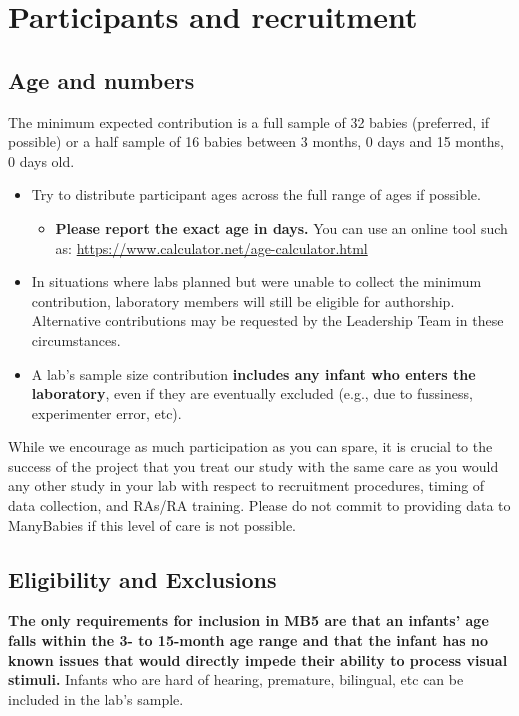 \documentclass[
]{book}
\providecommand{\tightlist}{%
  \setlength{\itemsep}{0pt}\setlength{\parskip}{0pt}}
\begin{document}
\section{Participants and recruitment}\label{participants-and-recruitment}

\subsection{Age and numbers}\label{age-and-numbers}

The minimum expected contribution is a full sample of 32 babies (preferred, if possible) or a half sample of 16 babies between 3 months, 0 days and 15 months, 0 days old.

\begin{itemize}
\tightlist
\item
  Try to distribute participant ages across the full range of ages if possible.

  \begin{itemize}
  \tightlist
  \item
    \textbf{Please report the exact age in days.} You can use an online tool such as: \url{https://www.calculator.net/age-calculator.html}
  \end{itemize}
\item
  In situations where labs planned but were unable to collect the minimum contribution, laboratory members will still be eligible for authorship. Alternative contributions may be requested by the Leadership Team in these circumstances.
\item
  A lab's sample size contribution \textbf{includes any infant who enters the laboratory}, even if they are eventually excluded (e.g., due to fussiness, experimenter error, etc).
\end{itemize}

While we encourage as much participation as you can spare, it is crucial to the success of the project that you treat our study with the same care as you would any other study in your lab with respect to recruitment procedures, timing of data collection, and RAs/RA training. Please do not commit to providing data to ManyBabies if this level of care is not possible.

\subsection{Eligibility and Exclusions}\label{eligibility-and-exclusions}

\textbf{The only requirements for inclusion in MB5 are that an infants' age falls within the 3- to 15-month age range and that the infant has no known issues that would directly impede their ability to process visual stimuli.} Infants who are hard of hearing, premature, bilingual, etc can be included in the lab's sample.
\end{document}
